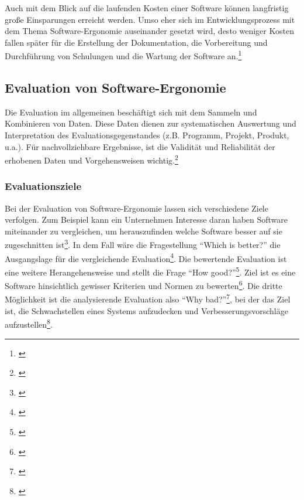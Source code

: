 Auch mit dem Blick auf die laufenden Kosten einer Software können langfristig große Einsparungen erreicht werden. Umso eher sich im Entwicklungsprozess mit dem Thema Software-Ergonomie auseinander gesetzt wird, desto weniger Kosten fallen später für die Erstellung der Dokumentation, die Vorbereitung und Durchführung von Schulungen und die Wartung der Software an.\footnote{\cite[vgl.][19]{Pruemper_Harten2007}}


\subsection{Evaluation von Software-Ergonomie}
Die Evaluation im allgemeinen beschäftigt sich mit dem Sammeln und Kombinieren von Daten. Diese Daten dienen zur systematischen Auswertung und Interpretation des Evaluationsgegenstandes (z.B. Programm, Projekt, Produkt, u.a.). Für nachvollziehbare Ergebnisse, ist die Validität und Reliabilität der erhobenen Daten und Vorgehensweisen wichtig.\footnote{\cite[vgl.][7]{Hegner2003}}


\subsubsection{Evaluationsziele}

Bei der Evaluation von Software-Ergonomie lassen sich verschiedene Ziele verfolgen. Zum Beispiel kann ein Unternehmen Interesse daran haben Software miteinander zu vergleichen, um herauszufinden welche Software besser auf sie zugeschnitten ist\footnote{\cite[vgl.][]{Gediga2002evaluation}}. In dem Fall wäre die Fragestellung \enquote{Which is better?} die Ausgangslage für die vergleichende Evaluation\footnote{\cite[vgl.][9]{Hegner2003}}. Die bewertende Evaluation ist eine weitere Herangehensweise und stellt die Frage \enquote{How good?}\footnote{\cite[vgl.][9]{Hegner2003}}. Ziel ist es eine Software hinsichtlich gewisser Kriterien und Normen zu bewerten\footnote{\cite[vgl.][]{Gediga2002evaluation}}. Die dritte Möglichkeit ist die analysierende Evaluation also \enquote{Why bad?}\footnote{\cite[vgl.][9]{Hegner2003}}, bei der das Ziel ist, die Schwachstellen eines Systems aufzudecken und Verbesserungsvorschläge aufzustellen\footnote{\cite[vgl.][]{Gediga2002evaluation}}.



